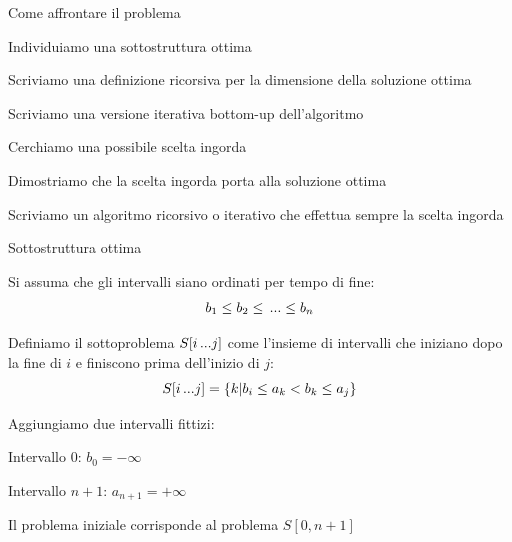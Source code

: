 \begin{frame}{Come affrontare il problema}

\vspace{-9pt}
\begin{myboxtitle}
\BI
\item Individuiamo una sottostruttura ottima
\item Scriviamo una definizione ricorsiva per la dimensione della soluzione ottima
\item Scriviamo una versione iterativa bottom-up dell'algoritmo
\EI
\end{myboxtitle}

\begin{myboxtitle}
\BI
\item Cerchiamo una possibile scelta ingorda
\item Dimostriamo che la scelta ingorda porta alla soluzione ottima
\item Scriviamo un algoritmo ricorsivo o iterativo che effettua sempre la scelta ingorda
\EI
\end{myboxtitle}

\end{frame}

\begin{frame}{Sottostruttura ottima}

\BIL
\item Si assuma che gli intervalli siano ordinati per tempo di fine:\\[-9pt]
\[
	b_1 \leq b_2 \leq \mydots \leq b_n
\]
\item Definiamo il \alert{sottoproblema $S[i \mydots j]$} come l'insieme
di intervalli che iniziano dopo la fine di $i$  e finiscono
prima dell'inizio di $j$:\\[-9pt]
\[
S[i \mydots j] = \{ k |  b_i \leq a_k < b_k \leq a_j \}
\]
\item Aggiungiamo due intervalli fittizi:
\BI
\item Intervallo $0$: $b_0 = -\infty$
\item Intervallo $n+1$: $a_{n+1} = +\infty$
\EI
\item Il problema iniziale corrisponde al problema 
$S[0,n+1]$
\EIL
\begin{center}
\end{center}
\end{frame}

